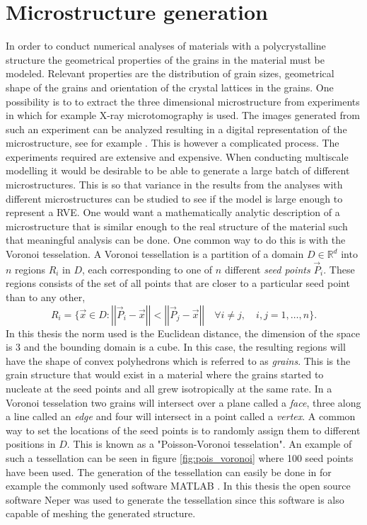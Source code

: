 \documentclass[micro_gen.tex]{subfiles}
\begin{document}
\chapter{Microstructure generation}

In order to conduct numerical analyses of materials with a polycrystalline structure the geometrical properties of the grains in the material must be modeled. Relevant properties are the distribution of grain sizes, geometrical shape of the grains and orientation of the crystal lattices in the grains.
One possibility is to to extract the three dimensional microstructure from experiments in which for example X-ray microtomography is used. The images generated from such an experiment can be analyzed resulting in a digital representation of the microstructure, see for example \cite{Bhandari200722}. This is however a complicated process. The experiments required are extensive and expensive. When conducting multiscale modelling it would be desirable to be able to generate a large batch of different microstructures. This is so that variance in the results from the analyses with different microstructures can be studied to see if the model is large enough to represent a RVE. 
One would want a mathematically analytic description of a microstructure that is similar enough to the real structure of the material such that meaningful analysis can be done. One common way to do this is with the Voronoi tesselation. A Voronoi tessellation is a partition of a domain $D \in \mathbb{R}^d$ into $n$ regions $R_i$ in $D$, each corresponding to one of $n$ different \textit{seed points} $\vec{P}_i$. These regions consists of the set of all points that are closer to a particular seed point than to any other,
%
\[R_i = \{ \vec{x} \in D : \left|\left| \vec{P}_i - \vec{x} \right|\right| < \left|\left| \vec{P}_j - \vec{x} \right|\right| \quad  \forall i \neq j, \quad i,j = 1, \ldots, n \}. \]
%
In this thesis the norm used is the Euclidean distance, the dimension of the space is 3 and the bounding domain is a cube. In this case, the resulting regions will have the shape of convex polyhedrons which is referred to as \textit{grains}. This is the grain structure that would exist in a material where the grains started to nucleate at the seed points and all grew isotropically at the same rate. In a Voronoi tesselation two grains will intersect over a plane called a \textit{face},
three along a line called an \textit{edge} and four will intersect in a point called a \textit{vertex}. A common way to set the locations of the seed points is to randomly assign them to different positions in $D$. 
This is known as a "Poisson-Voronoi tesselation". An example of such a tessellation can be seen in figure \ref{fig:pois_voronoi} where 100 seed points have been used. The generation of the tessellation can easily be done in for example the commonly used software MATLAB \cite{matlab:voronoi}. In this thesis the open source software Neper \cite{Quey20111729} was used to generate the tessellation since this software is also capable of meshing the generated structure. 
\end{document}
